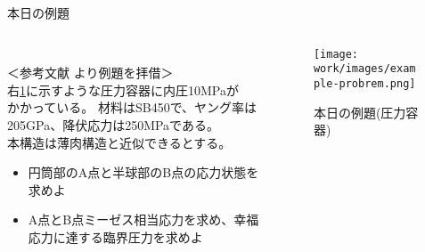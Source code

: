 \begin{frame}{本日の例題}
 
    \begin{columns}[t]
    \begin{column}{0.65\textwidth}
        \\
        ＜参考文献\cite{wanted} より例題を拝借＞ \\
        右\figurename \ref{fig:example-probrem}に示すような圧力容器に内圧10MPaが \\
        かかっている。
        材料はSB450で、ヤング率は205GPa、降伏応力は250MPaである。 \\
        本構造は薄肉構造と近似できるとする。
      \begin{itemize}
          \item{円筒部のA点と半球部のB点の応力状態を求めよ}
          \item{A点とB点ミーゼス相当応力を求め、幸福応力に達する臨界圧力を求めよ}
      \end{itemize}
    \end{column}
    \begin{column}{0.35\textwidth}
      \begin{figure}[htbp]
        \begin{center}
          \texttt{[image: work/images/example-probrem.png]}
            \caption{本日の例題(圧力容器)} \label{fig:example-probrem}
        \end{center}
      \end{figure}
    \end{column}
  \end{columns}

 
\end{frame}
